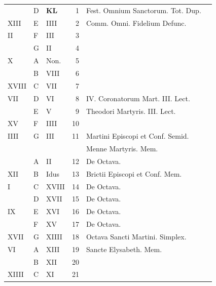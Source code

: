 \begin{center}
\begin{tabular}{l | l | l | r | l l}
\color{Red}  & D & \textbf{\color{Red} K\color{Blue}L} & 1 & Fest. Omnium Sanctorum. Tot. Dup. & \color{Red} \\
\color{Red} XIII & E & \color{Red} IIII & 2 & Comm. Omni. Fidelium Defunc. & \\
\color{Red} II & F & \color{Red} III & 3 & & \color{Red} \\
\color{Red}  & G & \color{Red} II & 4 & & \color{Red} \\
\color{Red} X & \color{Red} A & \color{Red} Non. & 5 & & \color{Red} \\
\color{Red}  & B & \color{Red} VIII & 6 & & \color{Red} \\
\color{Red} XVIII & C & \color{Red} VII & 7 & & \color{Red} \\
\color{Red} VII & D & \color{Red} VI & 8 & IV. Coronatorum Mart. III. Lect. & \color{Red} \\
\color{Red}  & E & \color{Red} V & 9 & Theodori Martyris. III. Lect. & \color{Red} \\
\color{Red} XV & F & \color{Red} IIII & 10 & & \color{Red} \\
\color{Red} IIII & G & \color{Red} III & 11 & \multicolumn{2}{l}{\color{Red} Martini Episcopi et Conf. Semid. } \\
& & & & \quad \color{Red} Menne Martyris. Mem. \color{Red} \\
\color{Red}  & \color{Red} A & \color{Red} II & 12 & De Octava. & \color{Red} \\
\color{Red} XII & B & \color{Red} Idus & 13 & Brictii Episcopi et Conf. Mem. & \color{Red} \\
\color{Red} I & C & \color{Red} XVIII & 14 & De Octava. & \color{Red} \\
\color{Red}  & D & \color{Red} XVII & 15 & De Octava. & \color{Red} \\
\color{Red} IX & E & \color{Red} XVI & 16 & De Octava. & \color{Red} \\
\color{Red}  & F & \color{Red} XV & 17 & De Octava. \\
\color{Red} XVII & G & \color{Red} XIIII & 18 & Octava Sancti Martini. \color{Red} Simplex. \\
\color{Red} VI & \color{Red} A & \color{Red} XIII & 19 & Sancte Elysabeth. Mem. & \color{Red} \\
\color{Red}  & B & \color{Red} XII & 20 & & \color{Red} \\
\color{Red} XIIII & C & \color{Red} XI & 21 & & \color{Red} \\

\end{tabular}
\end{center}
